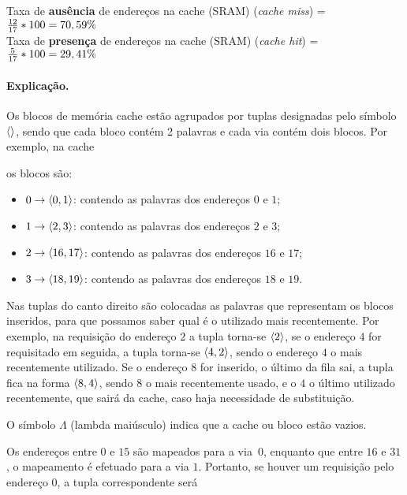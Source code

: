 Taxa de {\bf ausência} de endereços na cache (SRAM) ({\em cache miss}) =
${12 \over 17} * 100 = 70,59\%$ \\

Taxa de {\bf presença} de endereços na cache (SRAM) ({\em cache hit}) = ${5
  \over 17} * 100 = 29,41\%$

\paragraph{Explicação.} Os blocos de memória cache estão agrupados por
tuplas designadas pelo símbolo $\langle \rangle$, sendo que cada bloco contém 2 palavras e cada via
contém dois blocos. Por exemplo, na cache

\begin{center}
\end{center}

os blocos são:  

\begin{itemize}

\item $0 \rightarrow \langle 0,1\rangle$: contendo as palavras dos endereços $0$
  e $1$;
\item $1 \rightarrow \langle 2,3\rangle$: contendo as palavras dos endereços $2$
  e $3$; 
\item $2 \rightarrow \langle 16,17\rangle$: contendo as palavras dos endereços $16$
  e $17$; 
\item $3 \rightarrow \langle 18,19\rangle$: contendo as palavras dos endereços $18$
  e $19$. 

\end{itemize}

Nas tuplas do canto direito são colocadas as palavras que representam
os blocos inseridos, para que possamos saber qual é o utilizado mais
recentemente. Por exemplo, na requisição do endereço $2$ a tupla
torna-se $\langle 2\rangle$, se o endereço $4$ for requisitado em seguida, a
tupla torna-se $\langle 4,2\rangle$, sendo o endereço $4$ o mais recentemente
utilizado. Se o endereço $8$ for inserido, o último da fila sai, a
tupla fica na forma $\langle 8,4\rangle$, sendo $8$ o mais recentemente usado, e
o $4$ o último utilizado recentemente, que sairá da cache, caso haja
necessidade de substituição.

O símbolo $\Lambda$ (lambda maiúsculo) indica que a cache ou bloco estão vazios.

Os endereços entre $0$ e $15$ são mapeados para a via~$0$, enquanto
que entre $16$ e $31$, o mapeamento é efetuado para a via
$1$. Portanto, se houver um requisição pelo endereço $0$, a tupla
correspondente será

